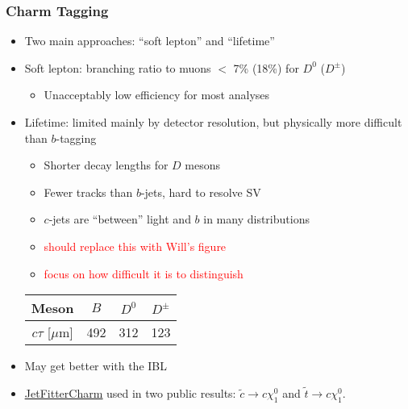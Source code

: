 \documentclass[usenames,dvipsnames]{beamer}
\newcommand{\link}[2]{\underline{\href{#2}{#1}}}
\begin{document}
\begin{frame}
  \frametitle{Charm Tagging}
  \begin{itemize}
  \item Two main approaches: ``soft lepton'' and ``lifetime''
  \item Soft lepton: branching ratio to muons $<$ 7\% (18\%) for $D^0$ ($D^\pm$)
    \begin{itemize}
    \item Unacceptably low efficiency for most analyses
    \end{itemize}
  \item Lifetime: limited mainly by detector resolution, but physically more difficult than $b$-tagging
    \begin{itemize}
    \item Shorter decay lengths for $D$ mesons
    \item Fewer tracks than $b$-jets, hard to resolve SV
    \item $c$-jets are ``between'' light and $b$ in many distributions
    \item \textcolor{red}{should replace this with Will's figure}
    \item \textcolor{red}{focus on how difficult it is to distinguish}
    \end{itemize}
    \begin{center}
      \begin{tabular}{c | c c c}
        Meson  &  $B$ & $D^0$ & $D^{\pm}$ \\ \hline
        $c\tau$ [$\mu$m] & 492 & 312 & 123 \\
      \end{tabular}
    \end{center}
  \item May get better with the IBL
  \item \link{JetFitterCharm}{%
    https://atlas.web.cern.ch/Atlas/GROUPS/PHYSICS/PUBNOTES/ATL-PHYS-PUB-2015-001/} used in two public results:
    \link{$\tilde{c} \to c\chi_1^0$}{http://arxiv.org/abs/1501.01325} and
    \link{$\tilde{t} \to c\chi_1^0$}{http://arxiv.org/abs/1407.0608}.
  \end{itemize}
\end{frame}
\end{document}
